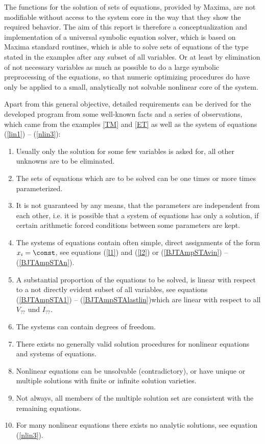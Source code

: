 The functions for the solution of sets of equations, provided by Maxima, are not modifiable without access to the system core in the way that they show the required behavior. The aim of this report is therefore a conceptualization and implementation of a universal symbolic equation solver, which is based on  Maxima standard routines, which is able to solve sets of equations of the type stated in the examples after any subset of all variables. Or at least by elimination of not necessary variables as much as possible  to do a large symbolic preprocessing of the equations, so that numeric optimizing procedures do have  only be applied to a small, analytically not solvable nonlinear core of the system. 

Apart from this general objective, detailed requirements can be derived for the developed program  from some well-known facts and a series of observations, which came from the examples \ref{TM} and \ref{ET}  as well as the system of equations (\ref{lin1}) -- (\ref{nlin3}):

\begin{enumerate}
\item Usually only the solution for some few variables is asked for, all other unknowns  are to be eliminated.

\item 
The sets of equations which are to be solved can be one times or more times parameterized.

\item 
It is not  guaranteed by any means, that the parameters are  independent from each other, i.e. it is possible that a system of equations has only a solution, if certain arithmetic forced conditions between some parameters are kept.

\item The systems of equations contain often simple, direct assignments of the form  $x_i = \const$, see equations (\ref{l1}) and 
(\ref{l2}) or (\ref{BJTAmpSTAvin}) -- (\ref{BJTAmpSTAn}).

\item A substantial proportion of the equations to be solved, is linear with respect to a not directly evident subset of all variables, see equations  (\ref{BJTAmpSTA1}) -- (\ref{BJTAmpSTAlastlin})which are linear with respect to all $V_{??}$ und $I_{??}$.

\item  The systems can contain degrees of freedom.

\item 
There exists no generally valid solution procedures for nonlinear equations and systems of equations.

\item 
Nonlinear equations can be unsolvable (contradictory), or have unique  or multiple solutions with finite or infinite solution varieties.

\item Not always, all members of the multiple solution set are consistent with the remaining equations.

\item  For many nonlinear equations there exists no analytic solutions, see equation (\ref{nlin3}).
\end{enumerate}


